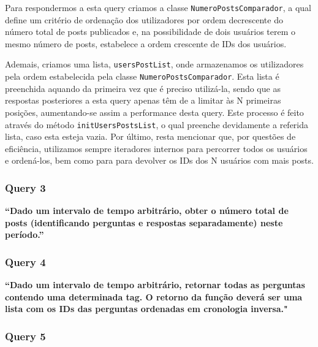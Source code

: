 \documentclass[a4paper]{article}
\begin{document}
\vspace{0.1cm}

Para respondermos a esta query criamos a classe \texttt{NumeroPostsComparador}, a
qual define um critério de ordenação dos utilizadores por ordem decrescente do
número total de posts publicados e, na possibilidade de dois usuários terem o mesmo número
de posts, estabelece a ordem crescente de IDs dos usuários.\par
Ademais, criamos uma lista, \texttt{usersPostList}, onde armazenamos os utilizadores
pela ordem estabelecida pela classe \texttt{NumeroPostsComparador}. Esta lista é
preenchida aquando da primeira vez que é preciso utilizá-la, sendo que as respostas
posteriores a esta query apenas têm de a limitar às N primeiras posições,
aumentando-se assim a performance desta query.
Este processo é feito através do método \texttt{initUsersPostsList}, o qual
preenche devidamente a referida lista, caso esta esteja vazia.
Por último, resta mencionar que, por questões de eficiência, utilizamos sempre
iteradores internos para percorrer todos os usuários e ordená-los, bem como para
para devolver os IDs dos N usuários com mais posts.



\subsubsection*{Query 3}
\label{sec:query3}

\textbf{“Dado um intervalo de tempo arbitrário,
obter o número total de posts (identificando perguntas e respostas separadamente) neste período.”}

\vspace{0.1cm}

\subsubsection*{Query 4}
\label{sec:query4}

\textbf{“Dado um intervalo de tempo arbitrário, retornar todas as perguntas contendo uma determinada tag.
O retorno da função deverá ser uma lista com os IDs das perguntas ordenadas em cronologia inversa."}

\vspace{0.1cm}




\subsubsection*{Query 5}
\label{sec:query5}
\end{document}
